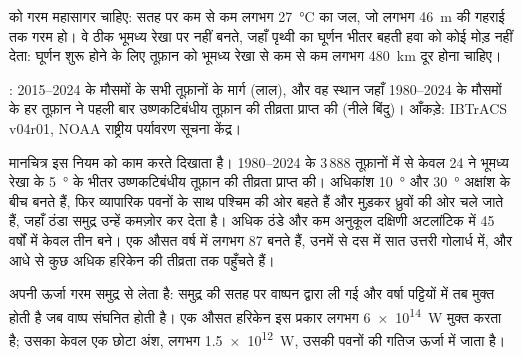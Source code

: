  को गरम महासागर चाहिए: सतह पर कम से कम लगभग
\qty{27}{\degreeCelsius} का जल, जो लगभग \qty{46}{m} की गहराई तक
गरम हो। वे ठीक भूमध्य रेखा पर नहीं बनते, जहाँ पृथ्वी का
घूर्णन भीतर बहती हवा को कोई मोड़ नहीं देता: घूर्णन शुरू होने के लिए तूफ़ान को भूमध्य रेखा से
कम से कम लगभग \qty{480}{km} दूर होना चाहिए।

\begin{omfigure}

{\small {}: 2015--2024 के मौसमों के सभी तूफ़ानों के मार्ग
(लाल), और वह स्थान जहाँ 1980--2024 के मौसमों के हर तूफ़ान ने
पहली बार उष्णकटिबंधीय तूफ़ान की तीव्रता प्राप्त की (नीले बिंदु)। आँकड़े: IBTrACS v04r01,
NOAA राष्ट्रीय पर्यावरण सूचना केंद्र।}
\end{omfigure}

मानचित्र इस नियम को काम करते दिखाता है। 1980--2024 के 3\,888 तूफ़ानों में से केवल 24
ने भूमध्य रेखा के \qty{5}{\degree} के भीतर उष्णकटिबंधीय तूफ़ान की तीव्रता प्राप्त की। अधिकांश
\qty{10}{\degree} और \qty{30}{\degree} अक्षांश के बीच बनते हैं, फिर
व्यापारिक पवनों के साथ पश्चिम की ओर बहते हैं और मुड़कर ध्रुवों की ओर चले जाते हैं, जहाँ
ठंडा समुद्र उन्हें कमज़ोर कर देता है। अधिक ठंडे और कम अनुकूल दक्षिणी अटलांटिक में
45 वर्षों में केवल तीन बने। एक औसत वर्ष में लगभग 87  बनते हैं,
उनमें से दस में सात उत्तरी गोलार्ध में, और आधे से कुछ अधिक
हरिकेन की तीव्रता तक पहुँचते हैं।

\begin{proposition}[उष्णकटिबंधीय चक्रवात का ऊर्जा स्रोत]\label{prop:g10:storms-and-cyclones:energy}
 अपनी ऊर्जा गरम समुद्र से लेता है: समुद्र की सतह पर वाष्पन द्वारा
ली गई   और वर्षा
पट्टियों में तब मुक्त होती है जब वाष्प संघनित होती है। एक औसत हरिकेन इस प्रकार
लगभग \qty{6e14}{W} मुक्त करता है; उसका केवल एक छोटा अंश, लगभग \qty{1.5e12}{W},
उसकी पवनों की गतिज ऊर्जा में जाता है।
\end{proposition}

